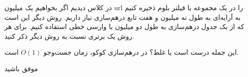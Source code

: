 \documentclass[12pt, a5paper]{article}
\newcommand{\vsp}{\vspace{25pt}}
\newcommand{\پاسخ}[2]{#1}
\begin{document}
\پاسخ{\vsp\vsp}{
	
}

در کلاس دیدیم اگر بخواهیم یک میلیون url را در یک مجموعه با فیلتر بلوم ذخیره کنیم به آرایه‌ای به طول نه میلیون و هفت تابع درهم‌سازی نیاز داریم. روش دیگر این است که از یک جدول درهم‌سازی به طول دو میلیون با وارسی خطی استفاده کنیم. برای هر روش یک برتری نسبت به روش دیگر ذکر کنید.


\پاسخ{\vsp\vsp}{
	
}

این جمله درست است یا غلط؟ در درهم‌سازی کوکو، زمان جست‌وجو  $O(1)$ است.

\پاسخ{\vsp\vsp}{
درست است زیر 
	
}
\vspace{1pt}
\begin{flushleft}
موفق باشید
\end{flushleft}
\end{document}
